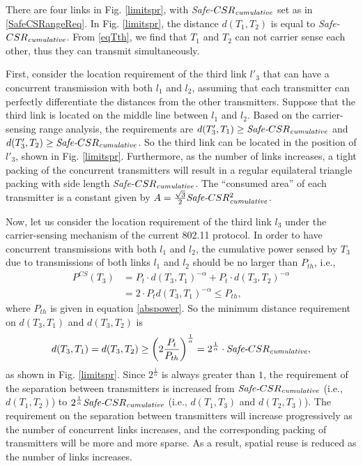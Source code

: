 \documentclass[conference]{IEEEtran}
\begin{document}
There are four links in Fig. \ref{limitspr}, with
\emph{Safe-}$CSR_{\text{\emph{cumulative}}}$ set as in
\eqref{SafeCSRangeReq}. In Fig. \ref{limitspr}, the distance
$d(T_1,T_2)$ is equal to
\emph{Safe-}$CSR_{\text{\emph{cumulative}}}$. From \eqref{eqTth}, we
f\/ind that $T_1$ and $T_2$ can not carrier sense each other, thus
they can transmit simultaneously.

First, consider the location requirement of the third link $l'_3$
that can have a concurrent transmission with both $l_1$ and $l_2$,
assuming that each transmitter can perfectly differentiate the
distances from the other transmitters. Suppose that the third link
is located on the middle line between $l_1$ and $l_2$. Based on the
carrier-sensing range analysis, the requirements are
$d(T'_3,T_1)\geq \text{\emph{Safe-}}CSR_{\text{\emph{cumulative}}}$
and $d(T'_3,T_2) \geq
\text{\emph{Safe-}}CSR_{\text{\emph{cumulative}}}$. So the third
link can be located in the position of $l'_3$, shown in Fig.
\ref{limitspr}. Furthermore, as the number of links increases, a
tight packing of the concurrent transmitters will result in a
regular equilateral triangle packing with side length
\emph{Safe-}$CSR_{\text{\emph{cumulative}}}$. The ``consumed area''
of each transmitter is a constant given by
$A=\frac{\sqrt{3}}{2}\emph{Safe-}CSR_{\text{\emph{cumulative}}}^2$.

Now, let us consider the location requirement of the third link
$l_3$ under the carrier-sensing mechanism of the current 802.11
protocol. In order to have concurrent transmissions with both $l_1$
and $l_2$, the cumulative power sensed by $T_3$ due to transmissions
of both links $l_1$ and $l_2$ should be no larger than $P_{th}$,
i.e.,
\begin{align}
P^{CS}(T_3)&=P_t\cdot d(T_3,T_1)^{-\alpha}+P_t\cdot
d(T_3,T_2)^{-\alpha}\nonumber\\
&=2\cdot P_t d(T_3,T_1)^{-\alpha}\leq P_{th},\nonumber
\end{align}
where $P_{th}$ is given in equation \eqref{abspower}. So the minimum
distance requirement on $d(T_3,T_1)$ and $d(T_3,T_2)$ is
\begin{equation}
d(T_3,T_1)=d(T_3,T_2)\geq
\left(2\frac{P_t}{P_{th}}\right)^{\frac{1}{\alpha}}=
2^{\frac{1}{\alpha}}\cdot
\text{\emph{Safe-}}CSR_{\text{\emph{cumulative}}},\nonumber
\end{equation}
as shown in Fig. \ref{limitspr}. Since $2^{\frac{1}{\alpha}}$ is
always greater than $1$, the requirement of the separation between
transmitters is increased from
$\text{\emph{Safe-}}CSR_{\text{\emph{cumulative}}}$ (i.e.,
$d(T_1,T_2)$) to
$2^{\frac{1}{\alpha}}\text{\emph{Safe-}}CSR_{\text{\emph{cumulative}}}$
(i.e., $d(T_1,T_3)$ and $d(T_2,T_3)$). The requirement on the
separation between transmitters will increase progressively as the
number of concurrent links increases, and the corresponding packing
of transmitters will be more and more sparse. As a result, spatial
reuse is reduced as the number of links increases.
\end{document}
